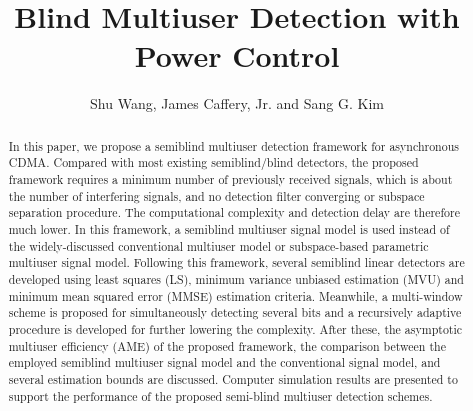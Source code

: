 \documentclass[a4paper,10pt,fleqn, twocolumn]{IEEETran}
\title{ Blind Multiuser Detection with Power Control}
\date{}
\author{Shu Wang, James Caffery, Jr. and Sang G. Kim}
\begin{document}
\maketitle
\begin{abstract}\small
In this paper, we propose a semiblind multiuser detection
framework for asynchronous CDMA. Compared with most existing
semiblind/blind detectors, the proposed framework requires a
minimum number of previously received signals, which is about the
number of interfering signals, and no detection filter converging
or subspace separation procedure. The computational complexity and
detection delay are therefore much lower. In this framework, a
semiblind multiuser signal model is used instead of the
widely-discussed conventional multiuser model or subspace-based
parametric multiuser signal model. Following this framework,
several semiblind linear detectors are developed using least
squares (LS), minimum variance unbiased estimation (MVU) and
minimum mean squared error (MMSE) estimation criteria. Meanwhile,
a multi-window scheme is proposed for simultaneously detecting
several bits and a recursively adaptive procedure is developed for
further lowering the complexity. After these, the asymptotic
multiuser efficiency (AME) of the proposed framework, the
comparison between the employed semiblind multiuser signal model
and the conventional signal model, and several estimation bounds
are discussed. Computer simulation results are presented to
support the performance of the proposed semi-blind multiuser
detection schemes.
\end{abstract}
\end{document}
